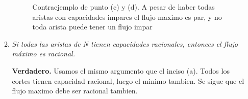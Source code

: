 \documentclass{article}
\begin{document}
\begin{enumerate}
\begin{enumerate}
\begin{figure}[ht]
    \caption{Contraejemplo de punto (c) y (d). A pesar de haber todas aristas con capacidades impares el flujo maximo es par, y no toda arista puede tener un flujo impar}
    \label{fig:flow_graph_redrawn}
\end{figure}

		\item \textit{Si todas las aristas de N tienen capacidades racionales, entonces el flujo máximo es racional.}
		
			\textbf{Verdadero.} Usamos el mismo argumento que el inciso (a). Todos los cortes tienen capacidad racional, luego el minimo tambien. Se sigue que el flujo maximo debe ser racional tambien.
\end{enumerate}
\end{enumerate}
\end{document}
